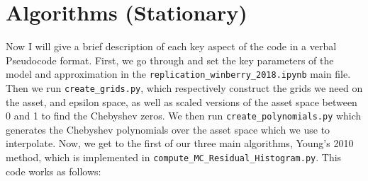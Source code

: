 \documentclass[11pt]{article}
\newcommand{\code}[1]{\texttt{#1}}
\begin{document}
\section{Algorithms (Stationary)}
Now I will give a brief description of each key aspect of the code in a verbal Pseudocode format. 
First, we go through and set the key parameters of the model and approximation in the \code{replication\_winberry\_2018.ipynb} main file.
Then we run \code{create\_grids.py}, which respectively construct the grids we need on the asset, and epsilon space, as well as scaled versions of the asset space between 0 and 1 to find the Chebyshev zeros. We then run \code{create\_polynomials.py} which generates the Chebyshev polynomials over the asset space which we use to interpolate. 
Now, we get to the first of our three main algorithms, Young's 2010 method, which is implemented in \code{compute\_MC\_Residual\_Histogram.py}. This code works as follows:
\end{document}
